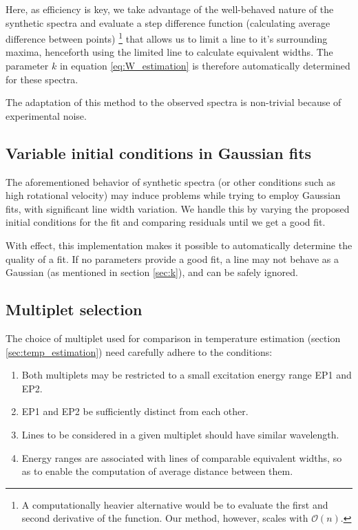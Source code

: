 \documentclass{aa}
\begin{document}
Here, as efficiency is key, we take advantage of the well-behaved nature of the
synthetic spectra and evaluate a step difference function (calculating average difference
between points) \footnote{A computationally heavier alternative would be to
  evaluate the first and second derivative of the function. Our method, however,
  scales with $\mathcal{O}(n)$.} that allows us to limit a line to it's
surrounding maxima, henceforth using the limited line to calculate equivalent
widths. The parameter $k$ in equation \ref{eq:W_estimation} is therefore automatically determined for these
spectra.

The adaptation of this method to the observed spectra is non-trivial because of experimental noise.

\subsection{Variable initial conditions in Gaussian fits}

The aforementioned behavior of synthetic spectra (or other conditions such as
high rotational velocity) may induce problems while trying to employ Gaussian
fits, with significant line width variation. We handle this by varying the
proposed initial conditions for the fit and comparing residuals until we get a
good fit.

With effect, this implementation makes it possible to automatically determine
the quality of a fit. If no parameters provide a good fit, a line may not
behave as a Gaussian (as mentioned in section \ref{sec:k}), and can be safely ignored.

\subsection{Multiplet selection}

The choice of multiplet used for comparison in temperature estimation (section
\ref{sec:temp_estimation}) need carefully adhere to the conditions:

\begin{enumerate}
\item Both multiplets may be restricted to a small excitation energy range EP1 and EP2.
\item EP1 and EP2 be sufficiently distinct from each other. 
\item Lines to be considered in a given multiplet should have similar wavelength.
\item Energy ranges are associated with lines of comparable equivalent widths,
  so as to enable the computation of average distance between them.
\end{enumerate}
\end{document}
